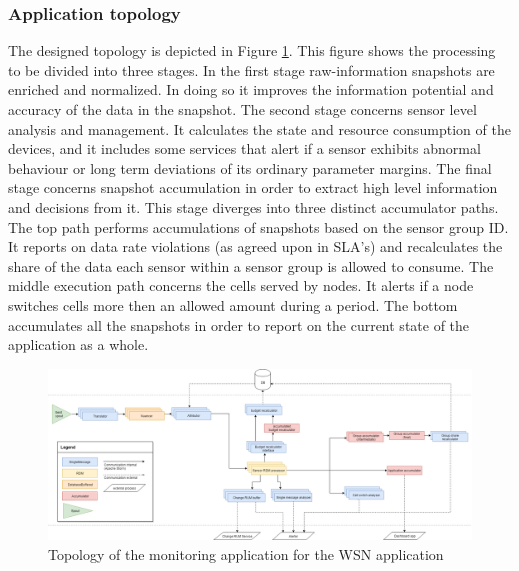 \subsubsection{Application topology}
The designed topology is depicted in Figure \ref{fig:sensit_topology}. This figure shows the processing to be divided into three stages. In the first stage raw-information snapshots are enriched and normalized. In doing so it improves the information potential and accuracy of the data in the snapshot. The second stage concerns sensor level analysis and management. It calculates the state and resource consumption of the devices, and it includes some services that alert if a sensor exhibits abnormal behaviour or long term deviations of its ordinary parameter margins. The final stage concerns snapshot accumulation in order to extract high level information and decisions from it. This stage diverges into three distinct accumulator paths. The top path performs accumulations of snapshots based on the sensor group ID. It reports on data rate violations (as agreed upon in SLA's) and recalculates the share of the data each sensor within a sensor group is allowed to consume. The middle execution path concerns the cells served by nodes. It alerts if a node switches cells more then an allowed amount during a period. The bottom accumulates all the snapshots in order to report on the current state of the application as a whole.

\begin{figure}
\centering
\includegraphics[width=1.15\textwidth]{resources/img/sensit_topology.png}
\caption{Topology of the monitoring application for the \idsystems \sensit WSN application}
\label{fig:sensit_topology}
\end{figure}


